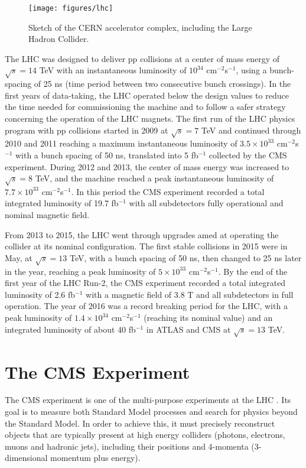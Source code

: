 \begin{figure}[h]
\centering 
\texttt{[image: figures/lhc]}\hfil
\caption{Sketch of the CERN accelerator complex, including the Large Hadron Collider. }
\label{fig:lhc}
\end{figure}

The LHC was designed to deliver pp collisions at a center of mass energy of $\sqrt{s} = 14$ TeV with an instantaneous luminosity of $10^{34}$ cm$^{-2}$s$^{-1}$, using a bunch-spacing of 25 ns (time period between two consecutive bunch crossings). 
In the first years of data-taking, the LHC operated below the design values to reduce the time needed for commissioning the machine and to follow a safer strategy concerning the operation of the LHC magnets.
The first run of the LHC physics program with pp collisions started in 2009 at $\sqrt{s} = 7$ TeV and continued through 2010 and 2011 reaching a maximum instantaneous luminosity of $3.5 \times 10^{33}$ cm$^{-2}$s$^{-1}$ with a bunch spacing of 50 ns, translated into 5 fb$^{-1}$ collected by the CMS experiment. 
During 2012 and 2013, the center of mass energy was increased to $\sqrt{s} = 8$ TeV, and the machine reached a peak instantaneous luminosity of $7.7 \times 10^{33}$ cm$^{-2}$s$^{-1}$. 
In this period the CMS experiment recorded a total integrated luminosity of 19.7 fb$^{-1}$ with all subdetectors fully operational and nominal magnetic field.

From 2013 to 2015, the LHC went through upgrades amed at operating the collider at its nominal configuration. 
The first stable collisions in 2015 were in May, at $\sqrt{s} = 13$ TeV, with a bunch spacing of 50 ns, then changed to 25 ns later in the year, reaching a peak luminosity of $5 \times 10^{33}$ cm$^{-2}$s$^{-1}$. 
By the end of the first year of the LHC Run-2, the CMS experiment recorded a total integrated
luminosity of 2.6 fb$^{-1}$ with a magnetic field of 3.8 T and all subdetectors in full operation. 
The year of 2016 was a record breaking period for the LHC, with a peak luminosity of $1.4\times10^{34}$ cm$^{-2}$s$^{-1}$ (reaching its nominal value) and an integrated luminosity of about 40 fb$^{-1}$ in ATLAS and CMS at $\sqrt{s} = 13$ TeV. 

\section{The CMS Experiment}

The CMS experiment is one of the multi-purpose experiments at the LHC \cite{cms_tdr}. 
Its goal is to measure both Standard Model processes and search for physics beyond the Standard Model. 
In order to achieve this, it must precisely reconstruct objects that are typically present at high energy colliders (photons, electrons, muons and hadronic jets), including their positions and 4-momenta (3-dimensional momentum plus energy).  

